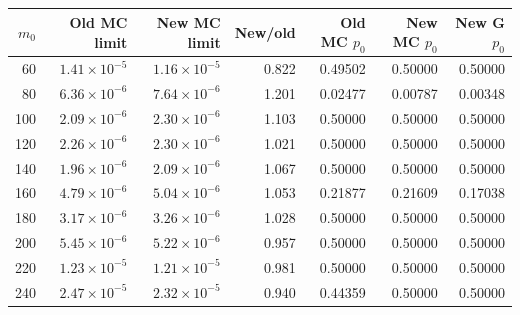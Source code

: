 \begin{tabular}{rrrrrrr}
\toprule
$m_0$ & Old MC limit & New MC limit & New/old & Old MC $p_0$ & New MC $p_0$ & New G $p_0$ \\
\midrule
60 & $1.41\times10^{-5}$ & $1.16\times10^{-5}$ & 0.822 & 0.49502 & 0.50000 & 0.50000 \\
80 & $6.36\times10^{-6}$ & $7.64\times10^{-6}$ & 1.201 & 0.02477 & 0.00787 & 0.00348 \\
100 & $2.09\times10^{-6}$ & $2.30\times10^{-6}$ & 1.103 & 0.50000 & 0.50000 & 0.50000 \\
120 & $2.26\times10^{-6}$ & $2.30\times10^{-6}$ & 1.021 & 0.50000 & 0.50000 & 0.50000 \\
140 & $1.96\times10^{-6}$ & $2.09\times10^{-6}$ & 1.067 & 0.50000 & 0.50000 & 0.50000 \\
160 & $4.79\times10^{-6}$ & $5.04\times10^{-6}$ & 1.053 & 0.21877 & 0.21609 & 0.17038 \\
180 & $3.17\times10^{-6}$ & $3.26\times10^{-6}$ & 1.028 & 0.50000 & 0.50000 & 0.50000 \\
200 & $5.45\times10^{-6}$ & $5.22\times10^{-6}$ & 0.957 & 0.50000 & 0.50000 & 0.50000 \\
220 & $1.23\times10^{-5}$ & $1.21\times10^{-5}$ & 0.981 & 0.50000 & 0.50000 & 0.50000 \\
240 & $2.47\times10^{-5}$ & $2.32\times10^{-5}$ & 0.940 & 0.44359 & 0.50000 & 0.50000 \\
\bottomrule
\end{tabular}
